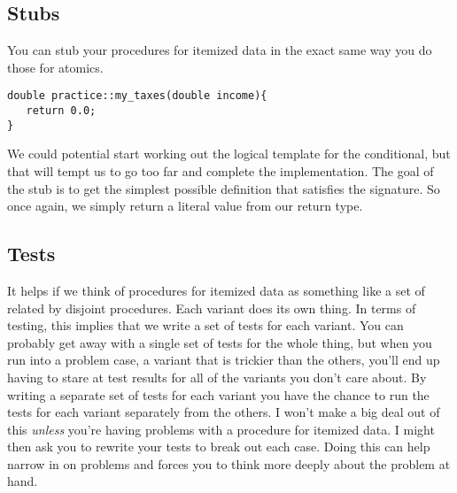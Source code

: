 \documentclass[]{tufte-handout}
\begin{document}
\subsection{Stubs}

You can stub your procedures for itemized data in the exact same way you do those for atomics. 
\begin{verbatim}
double practice::my_taxes(double income){
   return 0.0;
}
\end{verbatim}

We could potential start working out the logical template for the conditional, but that will tempt us to go too far and complete the implementation. The goal of the stub is to get the simplest possible definition that satisfies the signature. So once again, we simply return a literal value from our return type.

\subsection{Tests}

It helps if we think of procedures for itemized data as something like a set of related by disjoint procedures. Each variant does its own thing.  In terms of testing, this implies that we write a set of tests for each variant. You can probably get away with a single set of tests for the whole thing, but when you run into a problem case, a variant that is trickier than the others, you'll end up having to stare at test results for all of the variants you don't care about. By writing a separate set of tests for each variant you have the chance to run the tests for each variant separately from the others. I won't make a big deal out of this \textit{unless} you're having problems with a procedure for itemized data. I might then ask you to rewrite your tests to break out each case. Doing this can help narrow in on problems and forces you to think more deeply about the problem at hand. 
\end{document}
